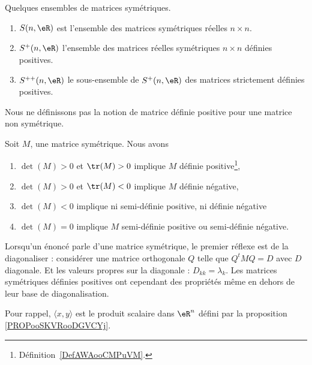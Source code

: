 \begin{normaltext}      \label{NORMooAJLHooQhwpvr}
	Quelques ensembles de matrices symétriques.
	\begin{enumerate}
		\item
		      \( S(n,\eR)\) est l'ensemble des matrices symétriques réelles \( n\times n\).
		\item
		      \( S^+(n,\eR)\) l'ensemble des matrices réelles symétriques \( n\times n\) définies positives.
		\item
		      \( S^{++}(n,\eR)\) le sous-ensemble de \( S^+(n,\eR)\) des matrices strictement définies positives.
	\end{enumerate}
\end{normaltext}

\begin{remark}
	Nous ne définissons pas la notion de matrice définie positive pour une matrice non symétrique.
\end{remark}

\begin{proposition}     \label{PropcnJyXZ}
	Soit \( M\), une matrice symétrique. Nous avons
	\begin{enumerate}
		\item       \label{ITEMooTJVQooYmRkas}
		      \( \det(M)>0\) et \( \tr(M)>0\) implique \( M\) définie positive\footnote{Définition~\ref{DefAWAooCMPuVM}.},
		\item
		      \( \det(M)>0\) et \( \tr(M)<0\) implique \( M\) définie négative,
		\item       \label{ItemluuFPN}
		      \( \det(M)<0\) implique ni semi-définie positive, ni définie négative
		\item
		      \( \det(M)=0\) implique \( M\) semi-définie positive ou semi-définie négative.
	\end{enumerate}
\end{proposition}

Lorsqu'un énoncé parle d'une matrice symétrique, le premier réflexe est de la diagonaliser : considérer une matrice orthogonale \( Q\) telle que \( Q^tMQ=D\) avec \( D\) diagonale. Et les valeurs propres sur la diagonale : \( D_{kk}=\lambda_k\). Les matrices symétriques définies positives ont cependant des propriétés même en dehors de leur base de diagonalisation.

Pour rappel, \( \langle x, y\rangle \) est le produit scalaire dans \( \eR^n\) défini par la proposition \ref{PROPooSKVRooDGVCYj}.

